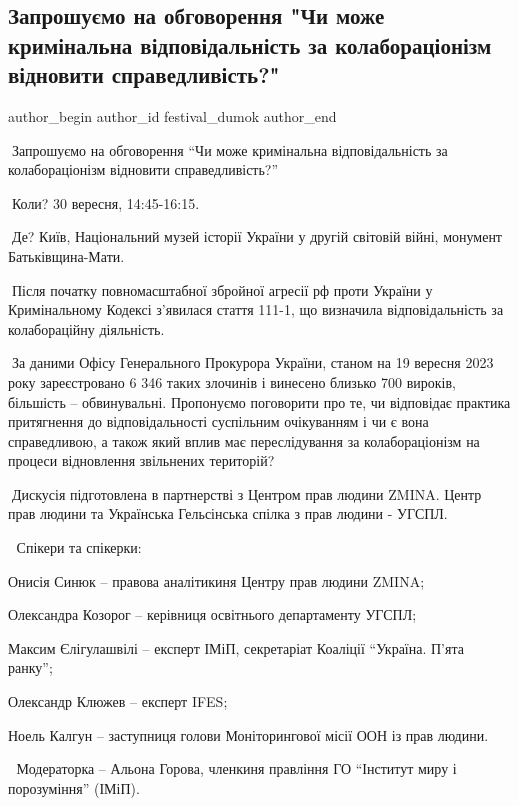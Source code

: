  
 
 
 
 

\subsection{Запрошуємо на обговорення "Чи може кримінальна відповідальність за колабораціонізм відновити справедливість?"}
\label{sec:26_09_2023.fb.festival_dumok.1.zaprosh_krym_vidpovid_kollab_spravedlyvist}

\ifcmt
 author_begin
   author_id festival_dumok
 author_end
\fi

📍Запрошуємо на обговорення \enquote{Чи може кримінальна відповідальність за колабораціонізм відновити справедливість?}

📍Коли? 30 вересня, 14:45-16:15. 

📍Де? Київ, Національний музей історії України у другій світовій війні, монумент Батьківщина-Мати. 

🚨Після початку повномасштабної збройної агресії рф проти України у
Кримінальному Кодексі з'явилася стаття 111-1, що визначила відповідальність за
колабораційну діяльність.

🚨За даними Офісу Генерального Прокурора України, станом на 19 вересня 2023
року зареєстровано 6 346 таких злочинів і винесено близько 700 вироків,
більшість – обвинувальні. Пропонуємо поговорити про те, чи відповідає практика
притягнення до відповідальності суспільним очікуванням і чи є вона
справедливою, а також який вплив має переслідування за колабораціонізм на
процеси відновлення звільнених територій?

📢Дискусія підготовлена в партнерстві з Центром прав людини ZMINA. Центр прав
людини та Українська Гельсінська спілка з прав людини - УГСПЛ.

🎤 Спікери та спікерки:

Онисія Синюк – правова аналітикиня Центру прав людини ZMINA;\par
Олександра Козорог – керівниця освітнього департаменту УГСПЛ;\par
Максим Єлігулашвілі – експерт ІМіП, секретаріат Коаліції \enquote{Україна. П'ята ранку};\par
Олександр Клюжев – експерт IFES;\par
Ноель Калгун – заступниця голови Моніторингової місії ООН із прав людини. \par
📢 Модераторка – Альона Горова, членкиня правління ГО \enquote{Інститут миру і порозуміння} (ІМіП).\par
